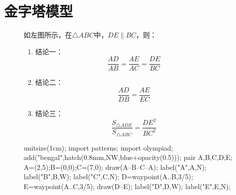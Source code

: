 \documentclass[12pt,space]{ctexart} %
\begin{document}
\section{金字塔模型}
\begin{figure}[ht]
	\begin{minipage}[b]{0.45\textwidth}
		如左图所示，在$\triangle ABC$中，$DE\parallel BC$，则：
		\begin{enumerate}
			\item 结论一：
			      \[
				      \frac{AD}{AB}=\frac{AE}{AC}=\frac{DE}{BC}
			      \]
			\item 结论二：
			      \[
				      \frac{AD}{DB}=\frac{AE}{EC}
			      \]
			\item 结论三：
			      \[
				      \frac{S_{\triangle ADE}}{S_{\triangle ABC}}=\frac{DE^2}{BC^2}
			      \]
		\end{enumerate}
	\end{minipage}
	\qquad
	\begin{minipage}[b]{0.45\textwidth}
		\begin{asy}
			unitsize(1cm);
			import patterns;
			import olympiad;
			add("bengal",hatch(0.8mm,NW,blue+opacity(0.5)));
			pair A,B,C,D,E;
			A=(2,5);B=(0,0);C=(7,0);
			draw(A--B--C--A);
			label("A",A,N);
			label("B",B,W);
			label("C",C,N);
			D=waypoint(A..B,3/5);
			E=waypoint(A..C,3/5);
			draw(D--E);
			label("D",D,W);
			label("E",E,N);
		\end{asy}
	\end{minipage}
\end{figure}
\end{document}

